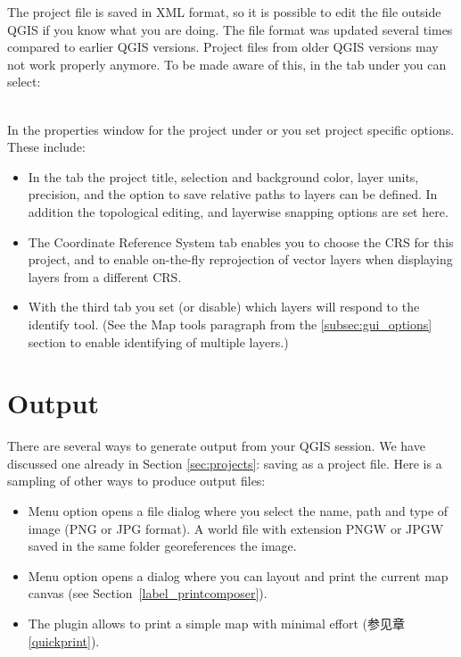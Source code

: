 The project file is saved in XML format, so it is possible to edit
the file outside QGIS if you know what you are doing. The file format
was updated several times compared to earlier QGIS versions. Project files
from older QGIS versions may not work properly anymore. To be made aware of this,
in the  tab under  \arrow {}
you can select: \\

 \\

In the properties window for the project under  or  you set project specific options. These
include:

\begin{itemize}
\item In the  tab the project title, selection and background
color, layer units, precision, and the option to save relative paths to
layers can be defined. In addition the topological editing, and layerwise
snapping options are set here.
\item The  Coordinate Reference System tab enables you to choose the
CRS for this project, and to enable on-the-fly reprojection of vector layers
when displaying layers from a different CRS.
\item With the third  tab you set (or disable) which
layers will respond to the identify tool. (See the Map tools paragraph from
the \ref{subsec:gui_options} section to enable identifying of multiple layers.)
\end{itemize}

\section{Output}\label{sec:output}

There are several ways to generate output from your QGIS session. We have
discussed one already in Section \ref{sec:projects}: saving as a project file.
Here is a sampling of other ways to produce output files:

\begin{itemize}
\item Menu option  opens
a file dialog where you select the name, path and type of image (PNG or JPG
format). A world file with extension PNGW or JPGW saved in the same folder
georeferences the image.
\item Menu option  opens a
dialog where you can layout and print the current map canvas (see
Section~\ref{label_printcomposer}).
\item The  plugin allows
to print a simple map with minimal effort (参见章 \ref{quickprint}).
\end{itemize}

